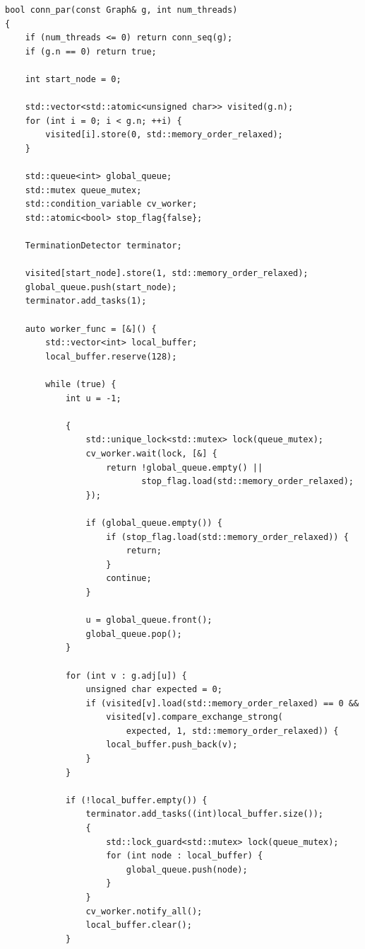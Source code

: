 \begin{lstlisting}[label={lst:conn-par}, caption={Реализация параллельного алгоритма проверки связности (BFS)}]
bool conn_par(const Graph& g, int num_threads)
{
    if (num_threads <= 0) return conn_seq(g);
    if (g.n == 0) return true;

    int start_node = 0;

    std::vector<std::atomic<unsigned char>> visited(g.n);
    for (int i = 0; i < g.n; ++i) {
        visited[i].store(0, std::memory_order_relaxed);
    }

    std::queue<int> global_queue;
    std::mutex queue_mutex;
    std::condition_variable cv_worker;
    std::atomic<bool> stop_flag{false};

    TerminationDetector terminator;

    visited[start_node].store(1, std::memory_order_relaxed);
    global_queue.push(start_node);
    terminator.add_tasks(1);

    auto worker_func = [&]() {
        std::vector<int> local_buffer;
        local_buffer.reserve(128);

        while (true) {
            int u = -1;

            {
                std::unique_lock<std::mutex> lock(queue_mutex);
                cv_worker.wait(lock, [&] {
                    return !global_queue.empty() ||
                           stop_flag.load(std::memory_order_relaxed);
                });

                if (global_queue.empty()) {
                    if (stop_flag.load(std::memory_order_relaxed)) {
                        return;
                    }
                    continue;
                }

                u = global_queue.front();
                global_queue.pop();
            }

            for (int v : g.adj[u]) {
                unsigned char expected = 0;
                if (visited[v].load(std::memory_order_relaxed) == 0 &&
                    visited[v].compare_exchange_strong(
                        expected, 1, std::memory_order_relaxed)) {
                    local_buffer.push_back(v);
                }
            }

            if (!local_buffer.empty()) {
                terminator.add_tasks((int)local_buffer.size());
                {
                    std::lock_guard<std::mutex> lock(queue_mutex);
                    for (int node : local_buffer) {
                        global_queue.push(node);
                    }
                }
                cv_worker.notify_all();
                local_buffer.clear();
            }


\end{lstlisting}
